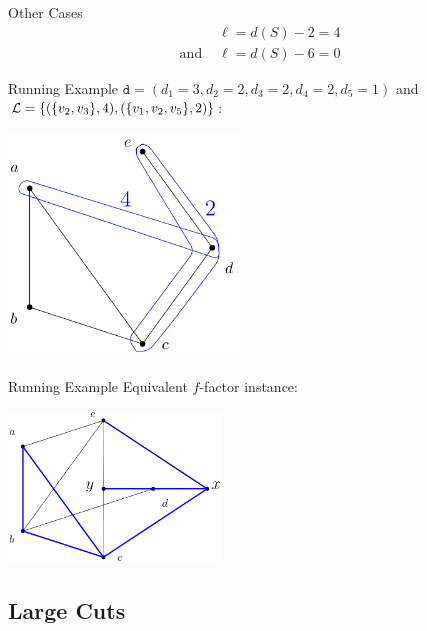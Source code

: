 \begin{frame}{Other Cases}
    \centering
    \Large
    \begin{align}
                    & \ell = d(S) - 2 = 4 \nonumber \\    
        \text{and } & \ell = d(S) - 6 = 0 \nonumber
    \end{align}
\end{frame}

\begin{frame}{Running Example}
  \centering
  $\texttt{d}=(d_1 = 3, d_2 = 2, d_3 = 2, d_4 = 2, d_5 = 1)$ and $\mathcal{L} = \{(\{v_2, v_3\}, 4), (\{v_1, v_2, v_5\}, 2)\}$:
  \bigbreak
  \begin{minipage}{\linewidth}
    \centering
    \includegraphics[height=6cm]{images/cut1.png}
  \end{minipage}
\end{frame}

\begin{frame}{Running Example}
  \centering
  Equivalent $f$-factor instance:
  \bigbreak
  \begin{minipage}{\linewidth}
    \centering
    \includegraphics[height=4cm]{images/factor1.png}
  \end{minipage}
\end{frame}

\subsection{Large Cuts}

